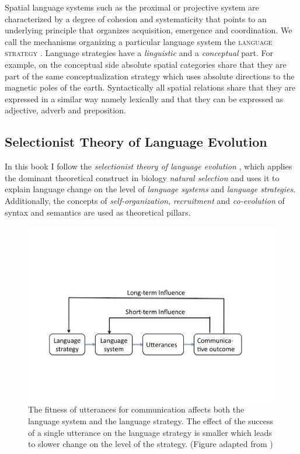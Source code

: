 Spatial language systems such as the proximal or projective system 
are characterized by a degree of cohesion and systematicity 
that points to an underlying principle that organizes acquisition, emergence 
and coordination. We call the mechanisms organizing a particular language
system the \textsc{language strategy} \citep{steels2011self-organization}.
Language strategies have a \emph{linguistic} and a \emph{conceptual} 
part. For example, on the conceptual 
side absolute spatial categories share that they
are part of the same conceptualization strategy which uses absolute directions
to the magnetic poles of the earth. Syntactically all spatial relations share
that they are expressed in a similar way namely lexically and that they can
be expressed as adjective, adverb and preposition. 


\subsection{Selectionist Theory of Language Evolution}
In this book I follow the \emph{selectionist theory of language evolution} 
\citep{steels2011self-organization}, which applies the dominant theoretical construct 
in biology \emph{natural selection} and uses it to explain language change
on the level of \emph{language systems} and \emph{language strategies}.
Additionally, the concepts of \emph{self-organization},
\emph{recruitment} and \emph{co-evolution} of syntax and semantics are
used as theoretical pillars.

\begin{figure}
\begin{center}
\includegraphics[width=0.7\columnwidth]{figs/select-strat}
\end{center}
\caption[Selective pressures on language systems and strategies]{The fitness of utterances for communication affects both the language
system and the language strategy. The effect of the success of a single utterance 
on the language strategy is smaller which leads to slower change on the level 
of the strategy. (Figure adapted from \citealp{steels2011self-organization})}
\label{f:strategy-system-selection}
\end{figure}




